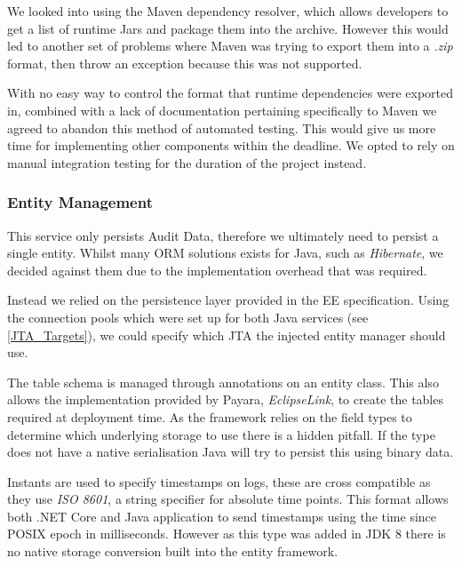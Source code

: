 \par
We looked into using the Maven dependency resolver, which allows developers to get a list of runtime Jars and package them into the archive. However this would led to another set of problems where Maven was trying to export them into a \textit{.zip} format, then throw an exception because this was not supported.

\par
With no easy way to control the format that runtime dependencies were exported in, combined with a lack of documentation pertaining specifically to Maven we agreed to abandon this method of automated testing. This would give us more time for implementing other components within the deadline. We opted to rely on manual integration testing for the duration of the project instead.

\subsubsection{Entity Management}
This service only persists Audit Data, therefore we ultimately need to persist a single entity. Whilst many ORM solutions exists for Java, such as \textit{Hibernate}, we decided against them due to the implementation overhead that was required.

\par
Instead we relied on the persistence layer provided in the EE specification. Using the connection pools which were set up for both Java services (see \ref{JTA_Targets}), we could specify which JTA the injected entity manager should use.

\par
The table schema is managed through annotations on an entity class. This also allows the implementation provided by Payara, \textit{EclipseLink}, to create the tables required at deployment time. As the framework relies on the field types to determine which underlying storage to use there is a hidden pitfall. If the type does not have a native serialisation Java will try to persist this using binary data.

\par
Instants are used to specify timestamps on logs, these are cross compatible as they use \textit{ISO 8601}, a string specifier for absolute time points. This format allows both .NET Core and Java application to send timestamps using the time since POSIX epoch in milliseconds. However as this type was added in JDK 8 there is no native storage conversion built into the entity framework.

